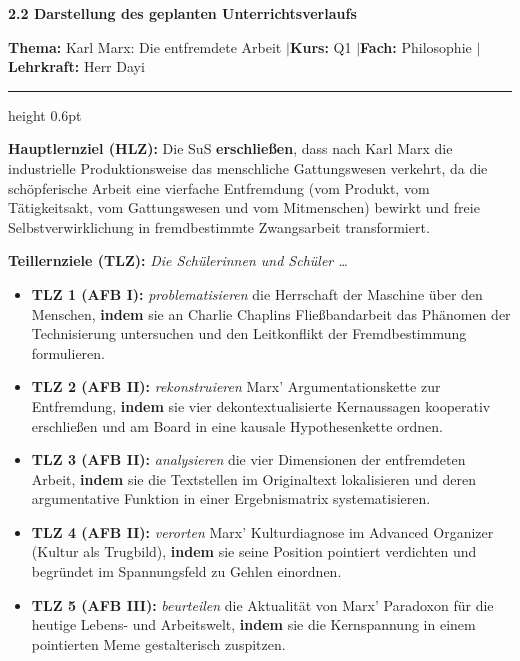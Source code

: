 \documentclass[a4paper, fontsize=9pt, landscape]{scrartcl}
\begin{document}
\noindent
\begin{minipage}[b]{0.38\textwidth}
    {\normalsize\bfseries 2.2 Darstellung des geplanten Unterrichtsverlaufs}
\end{minipage}%
\hfill
\begin{minipage}[b]{0.61\textwidth}
    \flushright
    {\footnotesize\textbf{Thema:} Karl Marx: Die entfremdete Arbeit \enskip$\vert$\enskip \textbf{Kurs:} Q1 \enskip$\vert$\enskip \textbf{Fach:} Philosophie \enskip$\vert$\enskip \textbf{Lehrkraft:} Herr Dayi}
\end{minipage}

\vspace{0.06cm}
\hrule height 0.6pt
\vspace{0.08cm}

\noindent
{\footnotesize\textbf{\color{primaryBlue}Hauptlernziel (HLZ):} Die SuS \textbf{erschließen}, dass nach Karl Marx die industrielle Produktionsweise das menschliche Gattungswesen verkehrt, da die schöpferische Arbeit eine vierfache Entfremdung (vom Produkt, vom Tätigkeitsakt, vom Gattungswesen und vom Mitmenschen) bewirkt und freie Selbstverwirklichung in fremdbestimmte Zwangsarbeit transformiert.}

\vspace{0.08cm}
\noindent
{\footnotesize\textbf{\color{primaryBlue}Teillernziele (TLZ):} \textit{Die Schülerinnen und Schüler \dots}}
\vspace{0.06cm}
\begin{itemize}[leftmargin=1.5em, itemsep=1.5pt, topsep=2pt, parsep=0pt, label=\color{primaryBlue}\footnotesize\textbullet]
    \footnotesize
    \item \textbf{TLZ 1 (AFB I):} \textit{problematisieren} die Herrschaft der Maschine über den Menschen, \textbf{indem} sie an Charlie Chaplins Fließbandarbeit das Phänomen der Technisierung untersuchen und den Leitkonflikt der Fremdbestimmung formulieren.
    \item \textbf{TLZ 2 (AFB II):} \textit{rekonstruieren} Marx’ Argumentationskette zur Entfremdung, \textbf{indem} sie vier dekontextualisierte Kernaussagen kooperativ erschließen und am Board in eine kausale Hypothesenkette ordnen.
    \item \textbf{TLZ 3 (AFB II):} \textit{analysieren} die vier Dimensionen der entfremdeten Arbeit, \textbf{indem} sie die Textstellen im Originaltext lokalisieren und deren argumentative Funktion in einer Ergebnismatrix systematisieren.
    \item \textbf{TLZ 4 (AFB II):} \textit{verorten} Marx’ Kulturdiagnose im Advanced Organizer (Kultur als Trugbild), \textbf{indem} sie seine Position pointiert verdichten und begründet im Spannungsfeld zu Gehlen einordnen.
    \item \textbf{TLZ 5 (AFB III):} \textit{beurteilen} die Aktualität von Marx’ Paradoxon für die heutige Lebens- und Arbeitswelt, \textbf{indem} sie die Kernspannung in einem pointierten Meme gestalterisch zuspitzen.
\end{itemize}
\vspace{0.05cm}
\end{document}
